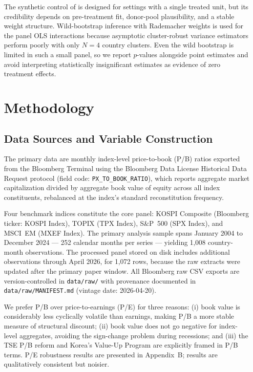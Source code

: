 \documentclass[12pt]{article}
\begin{document}
The synthetic control of \citet{abadie2010} is designed for settings with a single treated
unit, but its credibility depends on pre-treatment fit, donor-pool plausibility, and a stable
weight structure. Wild-bootstrap inference \citep{cameron2008} with Rademacher weights is used
for the panel OLS interactions because asymptotic cluster-robust variance estimators perform
poorly with only $N=4$ country clusters. Even the wild bootstrap is limited in such a small
panel, so we report $p$-values alongside point estimates and avoid interpreting statistically
insignificant estimates as evidence of zero treatment effects.

\section{Methodology}
\label{sec:methodology}

\subsection{Data Sources and Variable Construction}

The primary data are monthly index-level price-to-book (P/B) ratios exported from the
Bloomberg Terminal using the Bloomberg Data License Historical Data Request protocol
(field code: \texttt{PX\_TO\_BOOK\_RATIO}), which reports aggregate market capitalization
divided by aggregate book value of equity across all index constituents, rebalanced at the
index's standard reconstitution frequency.

Four benchmark indices constitute the core panel: KOSPI Composite (Bloomberg ticker:
KOSPI Index), TOPIX (TPX Index), S\&P~500 (SPX Index), and MSCI~EM (MXEF Index). The primary
analysis sample spans January 2004 to December 2024 --- 252 calendar months per series ---
yielding 1,008 country-month observations. The processed panel stored on disk includes
additional observations through April 2026, for 1,072 rows, because the raw extracts were
updated after the primary paper window. All Bloomberg raw CSV exports are version-controlled
in \texttt{data/raw/} with provenance documented in \texttt{data/raw/MANIFEST.md} (vintage
date: 2026-04-20).

We prefer P/B over price-to-earnings (P/E) for three reasons: (i) book value is considerably
less cyclically volatile than earnings, making P/B a more stable measure of structural
discount; (ii) book value does not go negative for index-level aggregates, avoiding the
sign-change problem during recessions; and (iii) the TSE P/B reform and Korea's Value-Up
Program are explicitly framed in P/B terms. P/E robustness results are presented in
Appendix~B; results are qualitatively consistent but noisier.
\end{document}
